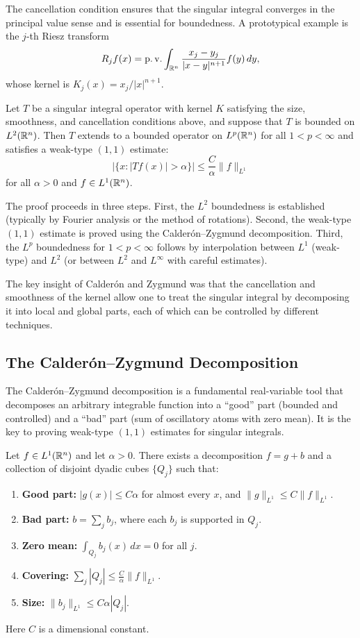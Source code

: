 The cancellation condition ensures that the singular integral converges in the principal value sense and is essential for boundedness. A prototypical example is the $j$-th Riesz transform
\[
R_j f(x) = \operatorname{p.v.} \int_{\mathbb{R}^n} \frac{x_j - y_j}{|x - y|^{n+1}} f(y) \,dy,
\]
whose kernel is $K_j(x) = x_j / |x|^{n+1}$.

\begin{theorem}
Let $T$ be a singular integral operator with kernel $K$ satisfying the size, smoothness, and cancellation conditions above, and suppose that $T$ is bounded on $L^2(\mathbb{R}^n)$. Then $T$ extends to a bounded operator on $L^p(\mathbb{R}^n)$ for all $1 < p < \infty$ and satisfies a weak-type $(1,1)$ estimate:
\[
|\{x : |Tf(x)| > \alpha\}| \leq \frac{C}{\alpha} \|f\|_{L^1}
\]
for all $\alpha > 0$ and $f \in L^1(\mathbb{R}^n)$.
\end{theorem}

The proof proceeds in three steps. First, the $L^2$ boundedness is established (typically by Fourier analysis or the method of rotations). Second, the weak-type $(1,1)$ estimate is proved using the Calder\'{o}n--Zygmund decomposition. Third, the $L^p$ boundedness for $1 < p < \infty$ follows by interpolation between $L^1$ (weak-type) and $L^2$ (or between $L^2$ and $L^\infty$ with careful estimates).

The key insight of Calder\'{o}n and Zygmund was that the cancellation and smoothness of the kernel allow one to treat the singular integral by decomposing it into local and global parts, each of which can be controlled by different techniques.

\subsection{The Calder\'{o}n--Zygmund Decomposition}

The Calder\'{o}n--Zygmund decomposition is a fundamental real-variable tool that decomposes an arbitrary integrable function into a ``good'' part (bounded and controlled) and a ``bad'' part (sum of oscillatory atoms with zero mean). It is the key to proving weak-type $(1,1)$ estimates for singular integrals.

\begin{theorem}
Let $f \in L^1(\mathbb{R}^n)$ and let $\alpha > 0$. There exists a decomposition $f = g + b$ and a collection of disjoint dyadic cubes $\{Q_j\}$ such that:
\begin{enumerate}
    \item \textbf{Good part:} $|g(x)| \leq C\alpha$ for almost every $x$, and $\|g\|_{L^1} \leq C \|f\|_{L^1}$.
    \item \textbf{Bad part:} $b = \sum_j b_j$, where each $b_j$ is supported in $Q_j$.
    \item \textbf{Zero mean:} $\int_{Q_j} b_j(x)\,dx = 0$ for all $j$.
    \item \textbf{Covering:} $\sum_j |Q_j| \leq \frac{C}{\alpha} \|f\|_{L^1}$.
    \item \textbf{Size:} $\|b_j\|_{L^1} \leq C \alpha |Q_j|$.
\end{enumerate}
Here $C$ is a dimensional constant.
\end{theorem}

